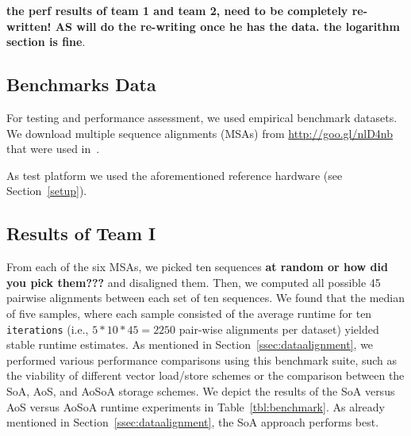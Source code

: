 \documentclass[runningheads,a4paper]{llncs}
\begin{document}
{\bf the perf results of team 1 and team 2, need to be completely re-written! AS will do the re-writing once he has the data. the logarithm section is fine}.

\subsection{Benchmarks Data}
\label{ssec:benchmark}



For testing and performance assessment, we used empirical benchmark datasets. We download multiple sequence alignments (MSAs) from \url{http://goo.gl/nlD4nb}
that were used in~\cite{bininda2005transalign}.

As test platform we used the aforementioned reference hardware (see Section~\ref{setup}).

\subsection{Results of Team I}
\label{res-team-1}

From each of the six MSAs, we picked ten sequences {\bf at random or how did you pick them???} and disaligned them.
Then, we computed all possible 45 pairwise alignments between each set of ten sequences. 
We found that the median of five samples, where each sample consisted of the average runtime for ten \texttt{iterations} 
(i.e., $5*10*45 = 2250$ pair-wise alignments per dataset) 
yielded stable runtime estimates. 
As mentioned in Section~\ref{ssec:dataalignment}, we performed various performance comparisons using this benchmark suite, 
such as the viability of different vector load/store schemes or the comparison between the SoA, AoS, and AoSoA storage schemes.
We depict the results of the SoA versus AoS versus AoSoA runtime experiments in Table~\ref{tbl:benchmark}. 
As already mentioned in Section~\ref{ssec:dataalignment}, the SoA approach performs best.
\end{document}
